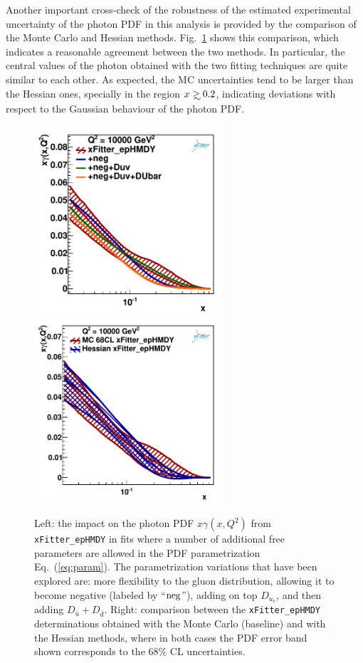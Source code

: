 Another important cross-check of the robustness of the estimated
experimental uncertainty of the photon PDF in this analysis is provided by the
comparison of the Monte Carlo and Hessian methods.
%
Fig.~\ref{fig:photon_mc_vs_hessian} shows this comparison, which
indicates a reasonable agreement between the two methods.
%
In particular, the central values of the photon obtained with the two
fitting techniques are quite similar to each other.
%
As expected, the MC uncertainties tend to be larger than the Hessian ones,
specially in the region $x\gsim 0.2$, indicating deviations with respect
to the Gaussian behaviour of the photon PDF.

\begin{figure}[t]
\centering
\includegraphics[width=7cm]{figs/q2_10000_pdf_ph_param_var.pdf}
\includegraphics[width=7cm]{figs/photon_mc_vs_hessian} 
\caption{Left: the impact on the photon PDF $x\gamma(x,Q^2)$
  from {\tt xFitter\_epHMDY}
  in fits where a number of additional free parameters are allowed
  in the PDF parametrization Eq.~(\ref{eq:param}).
  The parametrization variations that have been explored
  are: more flexibility to the gluon distribution, allowing
  it to become negative
  (labeled by ``${\rm neg}$''), adding on top $D_{u_v}$, and then
  adding $D_{\bar{u}}+D_{\bar{d}}$.
 Right: comparison between the {\tt xFitter\_epHMDY} determinations obtained with the
 Monte Carlo (baseline) and with the Hessian methods, where in
  both cases the PDF error band  shown corresponds to the 68\% CL uncertainties.  }
\label{fig:param}
\label{fig:photon_mc_vs_hessian}
\end{figure}


